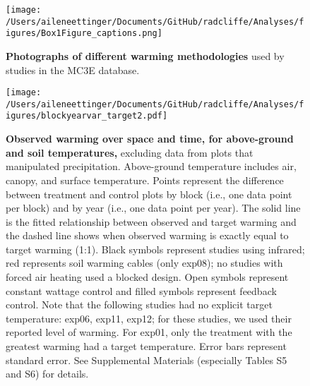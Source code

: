 \documentclass{article}
\begin{document}
\begin{figure}[h]
\centering
 \texttt{[image: /Users/aileneettinger/Documents/GitHub/radcliffe/Analyses/figures/Box1Figure\_captions.png]} 
 \caption{\textbf{Photographs of different warming methodologies} used by studies in the MC3E database.} 
\label{fig:exps}
\end{figure}
 


 \begin{figure}[h]
 \centering
 \texttt{[image: /Users/aileneettinger/Documents/GitHub/radcliffe/Analyses/figures/blockyearvar\_target2.pdf]} 
 \caption{\textbf{Observed warming over space and time, for above-ground and soil temperatures,} excluding data from plots that manipulated precipitation. Above-ground temperature includes air, canopy, and surface temperature. Points represent the difference between treatment and control plots by block (i.e., one data point per block) and by year (i.e., one data point per year). The solid line is the fitted relationship between observed and target warming and the dashed line shows when observed warming is exactly equal to target warming (1:1). Black symbols represent studies using infrared; red represents soil warming cables (only exp08); no studies with forced air heating used a blocked design. Open symbols represent constant wattage control and filled symbols represent feedback control. Note that the following studies had no explicit target temperature: exp06, exp11, exp12; for these studies, we used their reported level of warming. For exp01, only the treatment with the greatest warming had a target temperature. Error bars represent standard error. See Supplemental Materials (especially Tables S5 and S6) for details.}
 \label{fig:blockyear}
 \end{figure}
\end{document}
